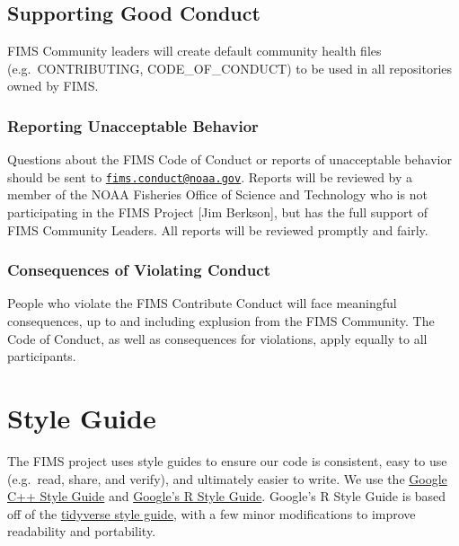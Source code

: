 \documentclass[
]{book}
\begin{document}
\hypertarget{supporting-good-conduct}{%
\section{Supporting Good Conduct}\label{supporting-good-conduct}}

FIMS Community leaders will create default community health files (e.g.~CONTRIBUTING, CODE\_OF\_CONDUCT) to be used in all repositories owned by FIMS.

\hypertarget{reporting-unacceptable-behavior}{%
\subsection{Reporting Unacceptable Behavior}\label{reporting-unacceptable-behavior}}

Questions about the FIMS Code of Conduct or reports of unacceptable behavior should be sent to \href{mailto:fims.conduct@noaa.gov}{\nolinkurl{fims.conduct@noaa.gov}}. Reports will be reviewed by a member of the NOAA Fisheries Office of Science and Technology who is not participating in the FIMS Project {[}Jim Berkson{]}, but has the full support of FIMS Community Leaders. All reports will be reviewed promptly and fairly.

\hypertarget{consequences-of-violating-conduct}{%
\subsection{Consequences of Violating Conduct}\label{consequences-of-violating-conduct}}

People who violate the FIMS Contribute Conduct will face meaningful consequences, up to and including explusion from the FIMS Community. The Code of Conduct, as well as consequences for violations, apply equally to all participants.

\hypertarget{style-guide}{%
\chapter{Style Guide}\label{style-guide}}

The FIMS project uses style guides to ensure our code is consistent, easy to use (e.g.~read, share, and verify), and ultimately easier to write. We use the \href{https://google.github.io/styleguide/cppguide.html}{Google C++ Style Guide} and \href{https://google.github.io/styleguide/Rguide.html}{Google's R Style Guide}. Google's R Style Guide is based off of the \href{https://style.tidyverse.org/}{tidyverse style guide}, with a few minor modifications to improve readability and portability.
\end{document}
